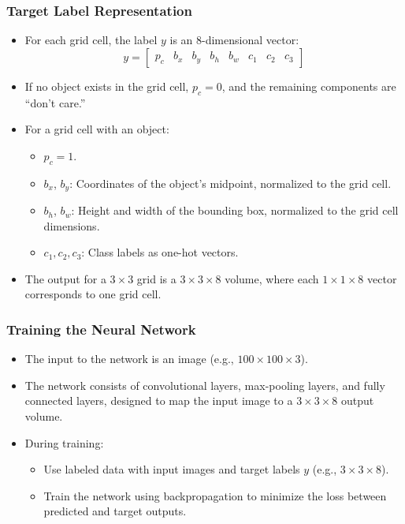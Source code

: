 \documentclass[letterpaper,12pt,notitlepage,twoside]{report}
\begin{document}
\subsubsection*{Target Label Representation}
\begin{itemize}
    \item For each grid cell, the label $y$ is an 8-dimensional vector:
    \[
    y = \begin{bmatrix}
    p_c & b_x & b_y & b_h & b_w & c_1 & c_2 & c_3
    \end{bmatrix}
    \]
    \item If no object exists in the grid cell, $p_c = 0$, and the remaining components are ``don't care.''
    \item For a grid cell with an object:
    \begin{itemize}
        \item $p_c = 1$.
        \item $b_x$, $b_y$: Coordinates of the object's midpoint, normalized to the grid cell.
        \item $b_h$, $b_w$: Height and width of the bounding box, normalized to the grid cell dimensions.
        \item $c_1, c_2, c_3$: Class labels as one-hot vectors.
    \end{itemize}
    \item The output for a $3 \times 3$ grid is a $3 \times 3 \times 8$ volume, where each $1 \times 1 \times 8$ vector corresponds to one grid cell.
\end{itemize}

\subsubsection*{Training the Neural Network}
\begin{itemize}
    \item The input to the network is an image (e.g., $100 \times 100 \times 3$).
    \item The network consists of convolutional layers, max-pooling layers, and fully connected layers, designed to map the input image to a $3 \times 3 \times 8$ output volume.
    \item During training:
    \begin{itemize}
        \item Use labeled data with input images and target labels $y$ (e.g., $3 \times 3 \times 8$).
        \item Train the network using backpropagation to minimize the loss between predicted and target outputs.
    \end{itemize}
\end{itemize}
\end{document}
